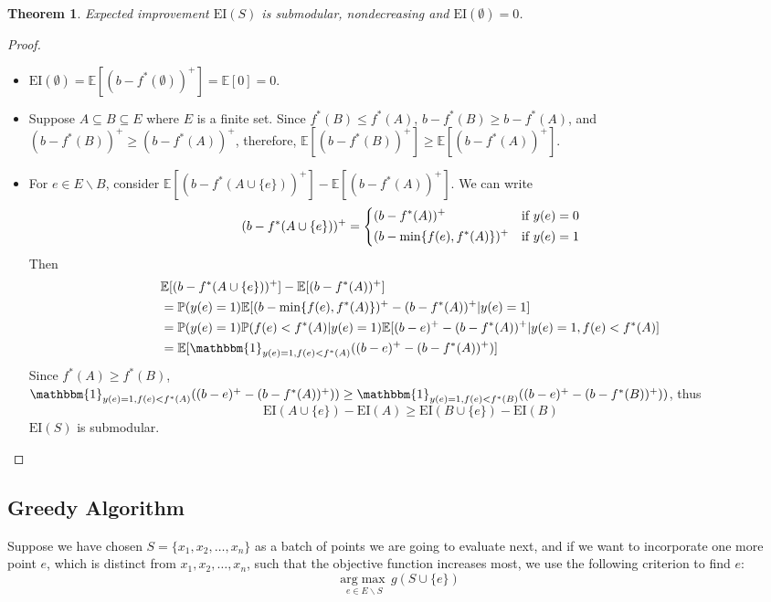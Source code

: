 \documentclass[11pt]{article}
\newcommand{\E}{\mathbb{E}}
\newcommand{\EI}{\mathrm{EI}}
\newtheorem{thm}{Theorem}
\begin{document}
\begin{thm}
Expected improvement $\EI(S)$ is submodular, nondecreasing and $\EI(\emptyset)=0$.
\end{thm}
\begin{proof}
\begin{itemize}
\item
$\EI(\emptyset) = \E[(b-f^*(\emptyset))^+] = \E[0] = 0$.
\item
Suppose $A \subseteq B \subseteq E$ where $E$ is a finite set. Since $f^*(B) \leq f^*(A)$, $b-f^*(B) \geq b-f^*(A)$, and $(b-f^*(B))^+ \geq (b-f^*(A))^+$, therefore, $\E[(b-f^*(B))^+] \geq \E[(b-f^*(A))^+]$.
\item
For $e \in E\backslash B$, consider $\E[(b-f^*(A \cup \{e\}))^+]-\E[(b-f^*(A))^+]$. We can write
\begin{equation*}
(b-f^*(A \cup \{e\}))^+ = \begin{dcases}
                         (b-f^*(A))^+ & \text{if $y(e)=0$} \\
                         (b-\min\{f(e),f^*(A)\})^+ & \text{if $y(e)=1$}
                         \end{dcases}
\end{equation*}
Then 
\begin{align*}
&\E[(b-f^*(A \cup \{e\}))^+]-\E[(b-f^*(A))^+] \\
&= \mathbb{P}(y(e)=1) \E[(b-\min\{f(e),f^*(A)\})^+ -(b-f^*(A))^+|y(e)=1]\\
&= \mathbb{P}(y(e)=1) \mathbb{P}(f(e)<f^*(A)|y(e)=1) \E[(b-e)^+-(b-f^*(A))^+|y(e)=1, f(e)<f^*(A)]\\
&= \E[ \mathbbm{1}_{y(e)=1, f(e)<f^*(A)} ((b-e)^+-(b-f^*(A))^+)]
\end{align*}
Since $f^*(A) \geq f^*(B)$, $\mathbbm{1}_{y(e)=1, f(e)<f^*(A)} ((b-e)^+-(b-f^*(A))^+)) \geq \mathbbm{1}_{y(e)=1, f(e)<f^*(B)} ((b-e)^+-(b-f^*(B))^+))$, thus
\begin{equation*}
\EI(A\cup \{e\})-\EI(A) \geq \EI(B\cup \{e\})-\EI(B)
\end{equation*}
$\EI(S)$ is submodular.

\end{itemize}
\end{proof}



\subsection{Greedy Algorithm}
Suppose we have chosen $S=\{x_1, x_2, \ldots, x_n\}$ as a batch of points we are going to evaluate next, and if we want to incorporate one more point $e$, which is distinct from $x_1, x_2, \ldots, x_n$, such that the objective function increases most, we use the following criterion to find $e$:
\begin{equation} \label{eq:greedy}
\underset{e \in E \backslash S}{\mathrm{arg}\max} \,g(S \cup \{e\})
\end{equation}
\end{document}
